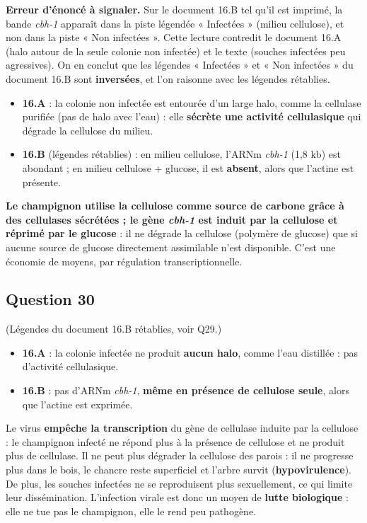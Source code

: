 \documentclass[11pt,a4paper]{article}
\providecommand{\tightlist}{\setlength{\itemsep}{0pt}\setlength{\parskip}{0pt}}
\begin{document}
\textbf{Erreur d'énoncé à signaler.} Sur le document 16.B tel qu'il est imprimé, la bande \emph{cbh-1} apparaît dans la piste légendée « Infectées » (milieu cellulose), et non dans la piste « Non infectées ». Cette lecture contredit le document 16.A (halo autour de la seule colonie non infectée) et le texte (souches infectées peu agressives). On en conclut que les légendes « Infectées » et « Non infectées » du document 16.B sont \textbf{inversées}, et l'on raisonne avec les légendes rétablies.

\begin{itemize}
\tightlist
\item
  \textbf{16.A} : la colonie non infectée est entourée d'un large halo, comme la cellulase purifiée (pas de halo avec l'eau) : elle \textbf{sécrète une activité cellulasique} qui dégrade la cellulose du milieu.
\item
  \textbf{16.B} (légendes rétablies) : en milieu cellulose, l'ARNm \emph{cbh-1} (1,8 kb) est abondant ; en milieu cellulose + glucose, il est \textbf{absent}, alors que l'actine est présente.
\end{itemize}

\textbf{Le champignon utilise la cellulose comme source de carbone grâce à des cellulases sécrétées ; le gène \emph{cbh-1} est induit par la cellulose et réprimé par le glucose} : il ne dégrade la cellulose (polymère de glucose) que si aucune source de glucose directement assimilable n'est disponible. C'est une économie de moyens, par régulation transcriptionnelle.

\hypertarget{question-30}{%
\subsection{Question 30}\label{question-30}}

(Légendes du document 16.B rétablies, voir Q29.)

\begin{itemize}
\tightlist
\item
  \textbf{16.A} : la colonie infectée ne produit \textbf{aucun halo}, comme l'eau distillée : pas d'activité cellulasique.
\item
  \textbf{16.B} : pas d'ARNm \emph{cbh-1}, \textbf{même en présence de cellulose seule}, alors que l'actine est exprimée.
\end{itemize}

Le virus \textbf{empêche la transcription} du gène de cellulase induite par la cellulose : le champignon infecté ne répond plus à la présence de cellulose et ne produit plus de cellulase. Il ne peut plus dégrader la cellulose des parois : il ne progresse plus dans le bois, le chancre reste superficiel et l'arbre survit (\textbf{hypovirulence}). De plus, les souches infectées ne se reproduisent plus sexuellement, ce qui limite leur dissémination. L'infection virale est donc un moyen de \textbf{lutte biologique} : elle ne tue pas le champignon, elle le rend peu pathogène.
\end{document}
